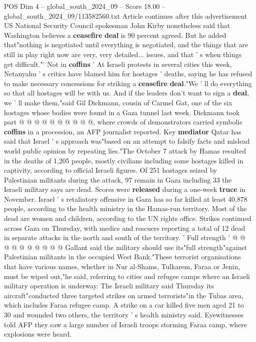 \begin{textsample}{POS Dim 4 – global\_south\_2024\_09 – Score 18.00 – global\_south\_2024\_09/113582560.txt}
Article continues after this advertisement US National Security Council spokesman John Kirby nonetheless said that Washington believes a \textbf{ceasefire} \textbf{deal} is 90 percent agreed.
But he added that"nothing is negotiated until everything is negotiated, and the things that are still in play right now are very, very detailed... issues, and that ' s when things get difficult."' Not in \textbf{coffins} ' At Israeli protests in several cities this week, Netanyahu ' s critics have blamed him for hostages ' deaths, saying he has refused to make necessary concessions for striking a \textbf{ceasefire} \textbf{deal}."We ' ll do everything so that all hostages will be with us.
And if the leaders don't want to sign a \textbf{deal}, we ' ll make them,"said Gil Dickmann, cousin of Carmel Gat, one of the six hostages whose bodies were found in a Gaza tunnel last week.
Dickmann took part @ @ @ @ @ @ @ @ @ @, where crowds of demonstrators carried symbolic \textbf{coffins} in a procession, an AFP journalist reported.
Key \textbf{mediator} Qatar has said that Israel ' s approach was"based on an attempt to falsify facts and mislead world public opinion by repeating lies."The October 7 attack by Hamas resulted in the deaths of 1,205 people, mostly civilians including some hostages killed in captivity, according to official Israeli figures.
Of 251 hostages seized by Palestinian militants during the attack, 97 remain in Gaza including 33 the Israeli military says are dead.
Scores were \textbf{released} during a one-week \textbf{truce} in November.
Israel ' s retaliatory offensive in Gaza has so far killed at least 40,878 people, according to the health ministry in the Hamas-run territory.
Most of the dead are women and children, according to the UN rights office.
Strikes continued across Gaza on Thursday, with medics and rescuers reporting a total of 12 dead in separate attacks in the north and south of the territory. ' Full strength ' @ @ @ @ @ @ @ @ @ @ Gallant said the military should use its"full strength"against Palestinian militants in the occupied West Bank."These terrorist organisations that have various names, whether in Nur al-Shams, Tulkarem, Faraa or Jenin, must be wiped out,"he said, referring to cities and refugee camps where an Israeli military operation is underway.
The Israeli military said Thursday its aircraft"conducted three targeted strikes on armed terrorists"in the Tubas area, which includes Faraa refugee camp.
A strike on a car killed five men aged 21 to 30 and wounded two others, the territory ' s health ministry said.
Eyewitnesses told AFP they saw a large number of Israeli troops storming Faraa camp, where explosions were heard.

\end{textsample}
